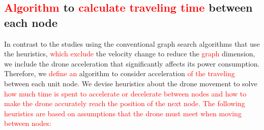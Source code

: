 \documentclass[journal]{./template/IEEEtran}
\begin{document}
\subsection{\textcolor{red}{Algorithm} to \textcolor{red}{calculate traveling time} between each node} %
\label{sub_Section: Graph search}


In contrast to the studies using the conventional graph search algorithms that use the heuristics, \textcolor{red}{which exclude} the velocity change to reduce the \textcolor{red}{graph} dimension, we include the drone acceleration that significantly affects its power consumption.
Therefore, we \textcolor{red}{define an} algorithm to consider acceleration \textcolor{red}{of the traveling} between each unit node. 
We devise heuristics about the drone movement to solve \textcolor{red}{how much time is spent to accelerate or decelerate between nodes and how to make the drone accurately reach the position of the next node.
The following heuristics are based on assumptions that the drone must meet when moving between nodes:}
\end{document}
